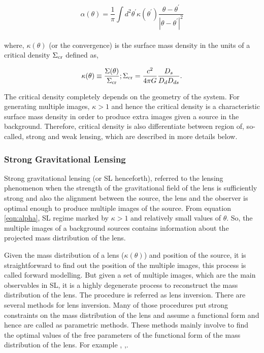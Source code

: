 \begin{equation}
	\alpha(\theta) = \dfrac{1}{\pi} \int d^2\theta^{\prime}
						\kappa(\theta^{\prime})
						\dfrac{\theta-\theta^{\prime}}{|\theta-\theta^{\prime}|^2}
	\label{eqn:alpha}
\end{equation}
\\
where, $\kappa(\theta)$ (or the convergence) is the surface mass density in the 
units of a critical density $\Sigma_{\rm cr}$ defined as,

\begin{equation}
	\kappa(\theta) \equiv \dfrac{\Sigma(\theta)}{\Sigma_{\rm cr}}; 
	\Sigma_{\rm cr} = \dfrac{c^2}{4\pi G} \dfrac{D_s}{D_d D_{ds}}.
\end{equation}

The critical density completely depends on the geometry of the system. For generating
multiple images, $\kappa>1$ and hence the critical density is a characteristic 
surface mass density in order to produce extra images given a source in the background.
Therefore, critical density is also differentiate between region
of, so-called, strong and weak lensing, which are described in more details below.

\subsubsection{Strong Gravitational Lensing}

Strong gravitational lensing (or SL henceforth), referred to the lensing phenomenon
when the strength of the gravitational field of the lens is sufficiently strong and 
also the alignment between the source, the lens and the observer is optimal enough to
produce multiple images of the source. From equation \ref{eqn:alpha}, SL regime marked
by $\kappa >1$ and relatively small values of $\theta$. So, the multiple images of a
background sources contains information about the projected mass distribution of the lens. 

Given the mass distribution of a lens ($\kappa(\theta)$) and position of the source,
it is straightforward to find out the position of the multiple images, this process
is called forward modelling. But given a set of multiple images, which are the main 
observables in SL, it is a highly degenerate process to reconstruct the mass
distribution of the lens. The procedure is referred as lens inversion. There are 
several methods for lens inversion. Many of those procedures put strong constraints
on the mass distribution of the lens and assume a functional form and hence are called
as parametric methods. These methods mainly involve to find the optimal values 
of the free parameters of the functional form of the mass distribution of the lens. 
For example \cite{}, \cite{},\cite{}.

